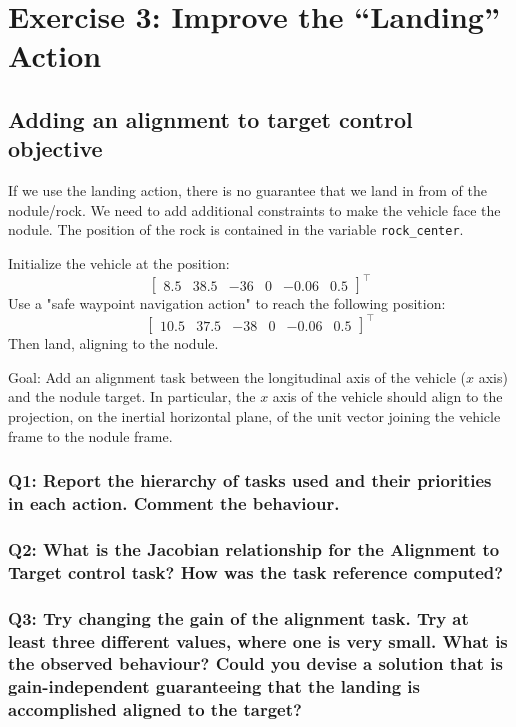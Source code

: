 \documentclass{article}
\begin{document}
\section{Exercise 3: Improve the “Landing” Action}
\subsection{Adding an alignment to target control objective}
If we use the landing action, there is no guarantee that we land in from of the nodule/rock. We need to add additional constraints to make the vehicle face the nodule. The position of the rock is contained in the variable \texttt{rock\_center}. 

Initialize the vehicle at the position:
\begin{displaymath}
\begin{bmatrix} 8.5 & 38.5 & -36 & 0 & -0.06 & 0.5 \end{bmatrix}^\top
\end{displaymath} 
Use a "safe waypoint navigation action" to reach the following position: 
\begin{displaymath}
\begin{bmatrix} 10.5 & 37.5 & -38 & 0 & -0.06 & 0.5 \end{bmatrix}^\top
\end{displaymath} 
Then land, aligning to the nodule.

Goal: Add an alignment task between the longitudinal axis of the vehicle ($x$ axis) and the nodule target. In particular, the $x$ axis of the vehicle should align to the projection, on the inertial horizontal plane, of the unit vector joining the vehicle frame to the nodule frame.

\subsubsection{Q1: Report the hierarchy of tasks used and their priorities in each action. Comment the behaviour.}

\subsubsection{Q2: What is the Jacobian relationship for the Alignment to Target control task? How was the task reference computed?}

\subsubsection{Q3: Try changing the gain of the alignment task. Try at least three different values, where one is very small. What is the observed behaviour? Could you devise a solution that is gain-independent guaranteeing that the landing is accomplished aligned to the target?}
\end{document}
